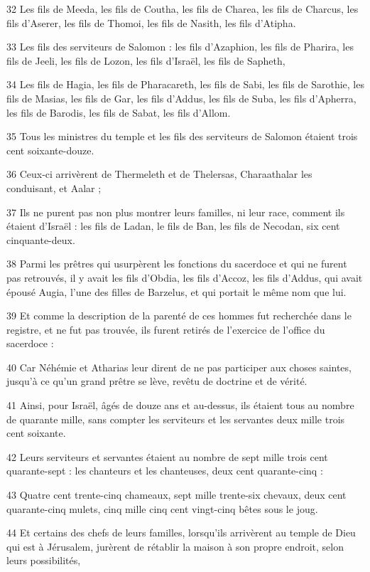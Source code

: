\par 32 Les fils de Meeda, les fils de Coutha, les fils de Charea, les fils de Charcus, les fils d'Aserer, les fils de Thomoi, les fils de Nasith, les fils d'Atipha.
\par 33 Les fils des serviteurs de Salomon : les fils d'Azaphion, les fils de Pharira, les fils de Jeeli, les fils de Lozon, les fils d'Israël, les fils de Sapheth,
\par 34 Les fils de Hagia, les fils de Pharacareth, les fils de Sabi, les fils de Sarothie, les fils de Masias, les fils de Gar, les fils d'Addus, les fils de Suba, les fils d'Apherra, les fils de Barodis, les fils de Sabat, les fils d'Allom.
\par 35 Tous les ministres du temple et les fils des serviteurs de Salomon étaient trois cent soixante-douze.
\par 36 Ceux-ci arrivèrent de Thermeleth et de Thelersas, Charaathalar les conduisant, et Aalar ;
\par 37 Ils ne purent pas non plus montrer leurs familles, ni leur race, comment ils étaient d'Israël : les fils de Ladan, le fils de Ban, les fils de Necodan, six cent cinquante-deux.
\par 38 Parmi les prêtres qui usurpèrent les fonctions du sacerdoce et qui ne furent pas retrouvés, il y avait les fils d'Obdia, les fils d'Accoz, les fils d'Addus, qui avait épousé Augia, l'une des filles de Barzelus, et qui portait le même nom que lui.
\par 39 Et comme la description de la parenté de ces hommes fut recherchée dans le registre, et ne fut pas trouvée, ils furent retirés de l'exercice de l'office du sacerdoce :
\par 40 Car Néhémie et Atharias leur dirent de ne pas participer aux choses saintes, jusqu'à ce qu'un grand prêtre se lève, revêtu de doctrine et de vérité.
\par 41 Ainsi, pour Israël, âgés de douze ans et au-dessus, ils étaient tous au nombre de quarante mille, sans compter les serviteurs et les servantes deux mille trois cent soixante.
\par 42 Leurs serviteurs et servantes étaient au nombre de sept mille trois cent quarante-sept : les chanteurs et les chanteuses, deux cent quarante-cinq :
\par 43 Quatre cent trente-cinq chameaux, sept mille trente-six chevaux, deux cent quarante-cinq mulets, cinq mille cinq cent vingt-cinq bêtes sous le joug.
\par 44 Et certains des chefs de leurs familles, lorsqu'ils arrivèrent au temple de Dieu qui est à Jérusalem, jurèrent de rétablir la maison à son propre endroit, selon leurs possibilités,

